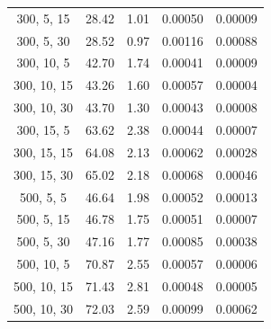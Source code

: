 \documentclass{article}
\begin{document}
\begin{table}[H]
{\begin{tabular}{|c|c|c|c|c|}
                300, 5, 15                 & 28.42                  & 1.01                  & 0.00050                  & 0.00009                 \\
                300, 5, 30                 & 28.52                  & 0.97                  & 0.00116                  & 0.00088                 \\
                300, 10, 5                 & 42.70                  & 1.74                  & 0.00041                  & 0.00009                 \\
                300, 10, 15                & 43.26                  & 1.60                  & 0.00057                  & 0.00004                 \\
                300, 10, 30                & 43.70                  & 1.30                  & 0.00043                  & 0.00008                 \\
                300, 15, 5                 & 63.62                  & 2.38                  & 0.00044                  & 0.00007                 \\
                300, 15, 15                & 64.08                  & 2.13                  & 0.00062                  & 0.00028                 \\
                300, 15, 30                & 65.02                  & 2.18                  & 0.00068                  & 0.00046                 \\
                500, 5, 5                  & 46.64                  & 1.98                  & 0.00052                  & 0.00013                 \\
                500, 5, 15                 & 46.78                  & 1.75                  & 0.00051                  & 0.00007                 \\
                500, 5, 30                 & 47.16                  & 1.77                  & 0.00085                  & 0.00038                 \\
                500, 10, 5                 & 70.87                  & 2.55                  & 0.00057                  & 0.00006                 \\
                500, 10, 15                & 71.43                  & 2.81                  & 0.00048                  & 0.00005                 \\
                500, 10, 30                & 72.03                  & 2.59                  & 0.00099                  & 0.00062                 \\

\end{tabular}}
\end{table}
\end{document}
